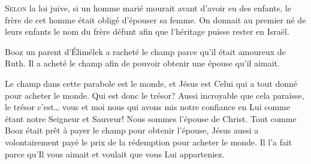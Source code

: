 \dvrule







\lettrine{S}{elon} la loi juive, si un homme marié mourait 
 avant d'avoir eu des enfants, le frère de cet homme était obligé
 d'épouser sa femme.
 On donnait au premier né de leurs enfants le nom du frère défunt
 afin que l'héritage puisse rester en Israël.

Booz \ocadr un parent d'Élimélek \fcadr{} a racheté le champ parce
 qu'il était amoureux de Ruth.
 Il a acheté le champ afin de pouvoir obtenir une épouse qu'il aimait.


Le champ dans cette parabole est le monde, et Jésus est Celui
 qui a tout donné pour acheter le monde. Qui est donc le trésor?
 Aussi incroyable que cela paraisse, le trésor c'est\dots{} vous et moi
 \ocadr nous qui avons mis notre confiance en Lui comme étant notre Seigneur
 et Sauveur!
 Nous sommes l'épouse de Christ.
 Tout comme Booz était prêt à payer le champ pour obtenir l'épouse,
 Jésus aussi a volontairement payé le prix de la rédemption
 pour acheter le monde.
 Il l'a fait parce qu'Il vous aimait et voulait que vous Lui apparteniez. 

\dvrule



